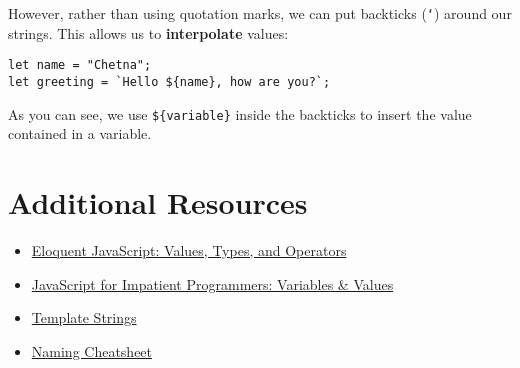 However, rather than using quotation marks, we can put backticks (\texttt{`}) around our strings. This allows us to \textbf{interpolate} values:

\begin{verbatim}
let name = "Chetna";
let greeting = `Hello ${name}, how are you?`;
\end{verbatim}

As you can see, we use \texttt{\$\{variable\}} inside the backticks to insert the value contained in a variable.

\section{Additional Resources}

\begin{itemize}[leftmargin=*]
    \item \href{https://eloquentjavascript.net/01_values.html}{Eloquent JavaScript: Values, Types, and Operators}
    \item \href{http://exploringjs.com/impatient-js/ch_variables-assignment.html}{JavaScript for Impatient Programmers: Variables \& Values}
    \item \href{https://developers.google.com/web/updates/2015/01/ES6-Template-Strings#string_substitution}{Template Strings}
    \item \href{https://github.com/kettanaito/naming-cheatsheet}{Naming Cheatsheet}
\end{itemize}
